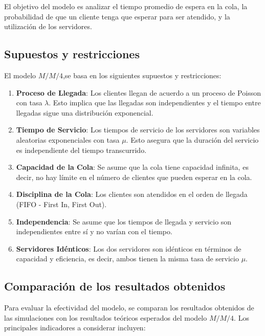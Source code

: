 \documentclass[10pt,twocolumn]{article}
\begin{document}
El objetivo del modelo es analizar el tiempo promedio de espera en la cola, la probabilidad de que un cliente tenga que esperar para ser atendido, y la utilización de los servidores.

\subsection{Supuestos y restricciones}

El modelo $M/M/4$,se basa en los siguientes supuestos y restricciones:

\begin{enumerate}
	\item \textbf{Proceso de Llegada}: Los clientes llegan de acuerdo a un proceso de Poisson con tasa $\lambda$. Esto implica que las llegadas son independientes y el tiempo entre llegadas sigue una distribución exponencial.
	\item \textbf{Tiempo de Servicio}: Los tiempos de servicio de los servidores son variables aleatorias exponenciales con tasa $\mu$. Esto asegura que la duración del servicio es independiente del tiempo transcurrido.
	\item \textbf{Capacidad de la Cola}: Se asume que la cola tiene capacidad infinita, es decir, no hay límite en el número de clientes que pueden esperar en la cola.
	\item \textbf{Disciplina de la Cola}: Los clientes son atendidos en el orden de llegada (FIFO - First In, First Out).
	\item \textbf{Independencia}: Se asume que los tiempos de llegada y servicio son independientes entre sí y no varían con el tiempo.
	\item \textbf{Servidores Idénticos}: Los dos servidores son idénticos en términos de capacidad y eficiencia, es decir, ambos tienen la misma tasa de servicio $\mu$.
\end{enumerate}

\subsection{Comparación de los resultados obtenidos}

Para evaluar la efectividad del modelo, se comparan los resultados obtenidos de las simulaciones con los resultados teóricos esperados del modelo $M/M/4$. Los principales indicadores a considerar incluyen:
\end{document}
